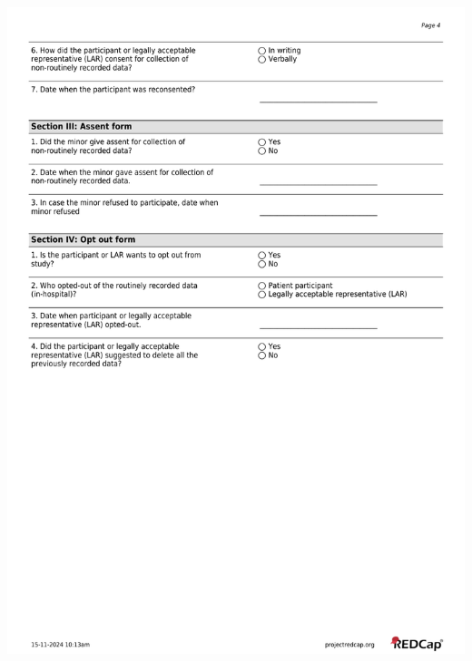 \documentclass[
]{scrartcl}
\begin{document}
\includegraphics{../case-record-form/instrument-pdfs/pages/all-instruments-4.pdf}
\end{document}
